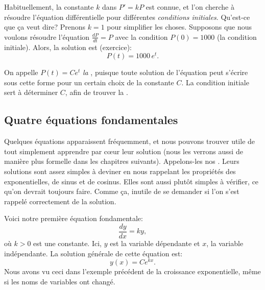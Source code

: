 Habituellement, la constante $k$ dans $P' = kP$ est connue, et l'on cherche à résoudre 
l'équation différentielle pour différentes \emph{conditions initiales}.  
Qu'est-ce que ça veut dire?  
Prenons $k=1$ pour simplifier les choses.  
Supposons que nous voulons résoudre l'équation $\frac{dP}{dt} = P$ 
avec la condition $P(0) = 1000$ (la condition initiale).
Alors, la solution est (exercice): 
\begin{equation*}
	P(t) = 1000 \, e^t .
\end{equation*}

On appelle $P(t) = C e^t$ \emph{la },
puisque toute solution de l'équation peut s'écrire sous cette forme pour un certain choix de la constante $C$.  
La condition initiale sert à déterminer $C$, afin de trouver la 
\emph{}.  

\subsection{Quatre équations fondamentales} \label{subsection:fourfundamental}

Quelques équations apparaissent fréquemment, et nous pouvons trouver utile de tout simplement apprendre par c{\oe}ur leur solution   
(nous les verrons aussi de manière plus formelle dans les chapitres suivants).  
Appelons-les nos . 
Leurs solutions sont assez simples à deviner 
en nous rappelant les propriétés des exponentielles, de sinus et de cosinus.  
Elles sont aussi plutôt simples à vérifier, ce qu'on devrait toujours faire.  
Comme ça, inutile de se demander si l'on s'est rappelé correctement de la solution.

\medskip

Voici notre première équation fondamentale: 
\begin{equation*}
	\frac{dy}{dx} = k y, 
\end{equation*}
où $k > 0$ est une constante.
Ici, $y$ est la variable dépendante et $x$, la variable indépendante.
La solution générale de cette équation est: 
\begin{equation*}
	y(x) = C e^{kx} .
\end{equation*}
Nous avons vu ceci dans l'exemple précédent de la croissance exponentielle, même si les noms de variables ont changé.

\medskip

